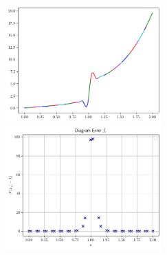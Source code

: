 \begin{figure}[H]
    \centering
    \includegraphics[width=6cm]{Images/figure_2/grafikS2n.png}
    \includegraphics[width=6cm]{Images/figure_2/plotS2n.png}
\end{figure}

